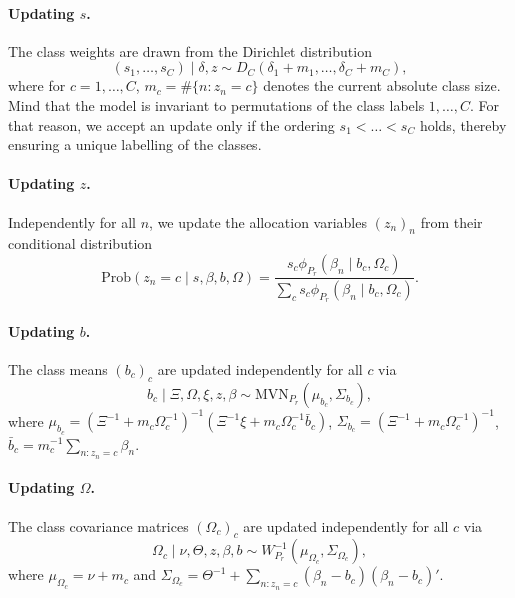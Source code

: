 \documentclass[article]{jss}
\newcommand{\MVN}[1]{\text{MVN}_{#1}}
\begin{document}
\paragraph{Updating $s$.} The class weights are drawn from the Dirichlet distribution
\begin{equation}
(s_1,\dots,s_C)\mid \delta,z \sim D_C(\delta_1+m_1,\dots,\delta_C+m_C),
\end{equation}
where for $c=1,\dots,C$, $m_c=\#\{n:z_n=c\}$ denotes the current absolute class size. Mind that the model is invariant to permutations of the class labels $1,\dots,C$. For that reason, we accept an update only if the ordering $s_1<\dots<s_C$ holds, thereby ensuring a unique labelling of the classes.

\paragraph{Updating $z$.} Independently for all $n$, we update the allocation variables $(z_n)_n$ from their conditional distribution
\begin{equation}
\text{Prob}(z_n=c\mid s,\beta,b,\Omega )=\frac{s_c\phi_{P_r}(\beta_n\mid b_c,\Omega_c)}{\sum_c s_c\phi_{P_r}(\beta_n\mid b_c,\Omega_c)}.
\end{equation}

\paragraph{Updating $b$.} The class means $(b_c)_c$ are updated independently for all $c$ via
\begin{equation}
b_c\mid \Xi,\Omega,\xi,z,\beta \sim\MVN{P_r}\left( \mu_{b_c}, \Sigma_{b_c}  \right),
\end{equation}
where $\mu_{b_c}=(\Xi^{-1}+m_c\Omega_c^{-1})^{-1}(\Xi^{-1}\xi +m_c\Omega_c^{-1}\bar{b}_c)$, $\Sigma_{b_c}=(\Xi^{-1}+m_c\Omega_c^{-1})^{-1}$, $\bar{b}_c=m_c^{-1}\sum_{n:z_n=c} \beta_n$.

\paragraph{Updating $\Omega$.} The class covariance matrices $(\Omega_c)_c$ are updated independently for all $c$ via
\begin{equation}
\Omega_c \mid \nu,\Theta,z,\beta,b \sim W^{-1}_{P_r}(\mu_{\Omega_c},\Sigma_{\Omega_c}),
\end{equation}
where $\mu_{\Omega_c}=\nu+m_c$ and $\Sigma_{\Omega_c}=\Theta^{-1} + \sum_{n:z_n=c} (\beta_n-b_c)(\beta_n-b_c)'$.
\end{document}

